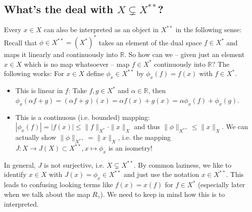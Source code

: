 \documentclass{scrartcl}
\theoremstyle{definition}
\theoremstyle{remark}
\newcommand{\R}{\mathbb R}
\DeclareRobustCommand{\mybox}[2][gray!20]{%
\begin{tcolorbox}[   %
        breakable,
        left=0pt,
        right=0pt,
        top=0pt,
        bottom=0pt,
        colback=#1,
        colframe=#1,
        width=\dimexpr\textwidth\relax, 
        enlarge left by=0mm,
        boxsep=5pt,
        arc=0pt,outer arc=0pt,
        ]
        #2
\end{tcolorbox}
}
\begin{document}
\mybox[gray!20]{
\subsection*{What's the deal with $X\subsetneq X^{**}$?}
Every $x\in X$ can also be interpreted as an object in $X^{**}$ in the following sense: Recall that $\phi \in X^{**} = (X^*)^*$ takes an element of the dual space $f\in X^*$ and maps it linearly and continuously into $\R$. So how can we -- given just an element $x\in X$ which is no map whatsoever -- map $f\in X^*$ continuously into $\R$? The following works: For $x\in X$ define $\phi_x \in X^{**}$ by $\phi_x(f) = f(x)$ with $f\in X^*$. 
\begin{itemize}
\item This is linear in $f$: Take $f,g\in X^*$ and $\alpha\in \R$, then $\phi_x(\alpha f+g) = (\alpha f+g)(x) = \alpha f(x) + g(x) = \alpha \phi_x(f) + \phi_x(g)$.
\item This is a continuous (i.e. bounded) mapping: $|\phi_x(f)| = |f(x)| \leq \|f\|_{X^*} \cdot \|x\|_X$ and thus $\|\phi\|_{X^{**}} \leq \|x\|_X$. We can actually show $\|\phi\|_{X^{**}} = \|x\|_X$, i.e. the mapping $J: X\to J(X)\subset X^{**}, x\mapsto \phi_x$ is an isometry! 
\end{itemize} 
In general, $J$ is not surjective, i.e. $X \subsetneq X^{**}$. By common laziness, we like to identify $x\in X$ with $J(x) = \phi_x\in X^{**}$ and just use the notation $x \in X^{**}$. This leads to confusing looking terms like $f(x) = x(f)$ for $f\in X^*$ (especially later when we talk about the map $R_\gamma$). We need to keep in mind how this is to interpreted.
}
\end{document}
